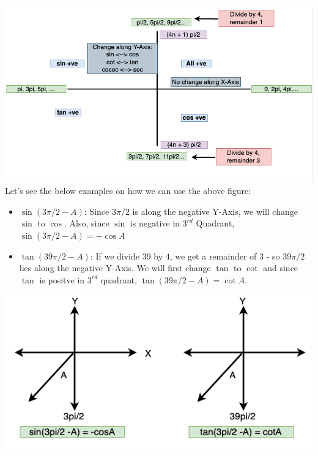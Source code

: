 \documentclass{book}
\begin{document}
	\includegraphics[scale=0.5]{reduction} \\
	
	Let's see the below examples on how we can use the above figure: \\
	
	\begin{itemize}
		\item $\sin(3\pi/2 - A)$: Since $3\pi/2$ is along the  negative Y-Axis, we will change $\sin$ to $\cos$. Also, since $\sin$ is negative in $3^{rd}$ Quadrant, $\sin(3\pi/2 - A) = -\cos{A}$ 
		\item $\tan(39\pi/2 - A)$:  If we divide $39$ by $4$, we get a remainder of $3$ - so $39\pi/2$ lies along the negative Y-Axis. We will first change $\tan$ to $\cot$ and since $\tan$ is positve in $3^{rd}$ quadrant, $\tan(39\pi/2 - A) = \cot{A}$. 
	\end{itemize}
	
	\includegraphics[scale=0.5]{reductionex}
	
	
\end{document}
